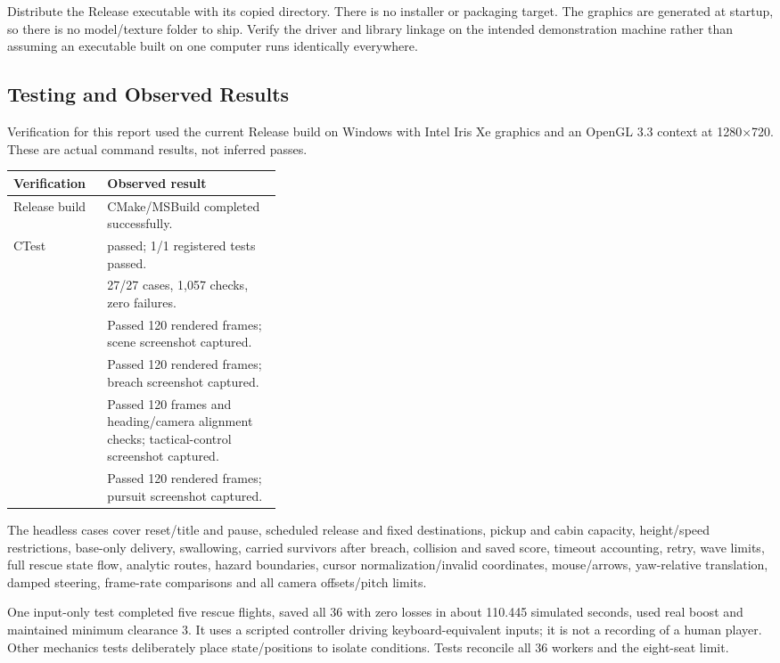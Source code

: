 Distribute the Release executable with its copied  directory. There is no installer or packaging target. The graphics are generated at startup, so there is no model/texture folder to ship. Verify the driver and library linkage on the intended demonstration machine rather than assuming an executable built on one computer runs identically everywhere.

\subsection{Testing and Observed Results}
Verification for this report used the current Release build on Windows with Intel Iris Xe graphics and an OpenGL 3.3 context at 1280$\times$720. These are actual command results, not inferred passes.
\begin{tabularx}{\linewidth}{L{0.35\linewidth}Y}
\toprule\textbf{Verification}&\textbf{Observed result}\\\midrule
Release build & CMake/MSBuild completed successfully.\\
CTest &  passed; 1/1 registered tests passed.\\
 & 27/27 cases, 1,057 checks, zero failures.\\
 & Passed 120 rendered frames; scene screenshot captured.\\
 & Passed 120 rendered frames; breach screenshot captured.\\
 & Passed 120 frames and heading/camera alignment checks; tactical-control screenshot captured.\\
 & Passed 120 rendered frames; pursuit screenshot captured.\\
\bottomrule
\end{tabularx}

The headless cases cover reset/title and pause, scheduled release and fixed destinations, pickup and cabin capacity, height/speed restrictions, base-only delivery, swallowing, carried survivors after breach, collision and saved score, timeout accounting, retry, wave limits, full rescue state flow, analytic routes, hazard boundaries, cursor normalization/invalid coordinates, mouse/arrows, yaw-relative translation, damped steering, frame-rate comparisons and all camera offsets/pitch limits.

One input-only test completed five rescue flights, saved all 36 with zero losses in about 110.445 simulated seconds, used real boost and maintained minimum clearance 3. It uses a scripted controller driving keyboard-equivalent inputs; it is not a recording of a human player. Other mechanics tests deliberately place state/positions to isolate conditions. Tests reconcile all 36 workers and the eight-seat limit.

